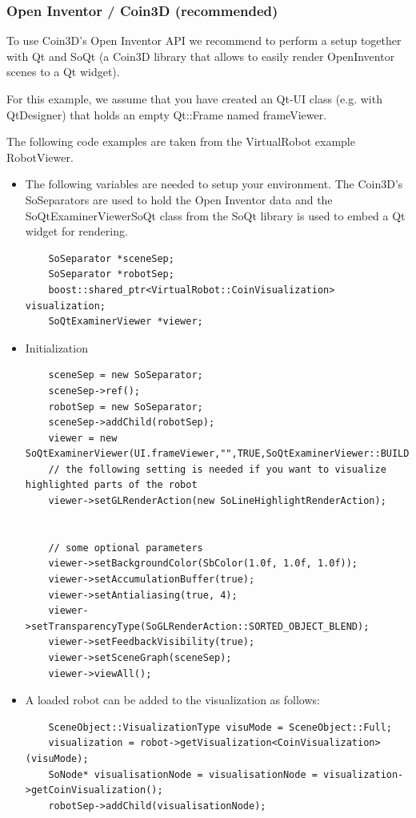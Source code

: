 \subsubsection{Open Inventor / Coin3D (recommended)}
To use Coin3D's Open Inventor API we recommend to perform a setup together with Qt and SoQt (a Coin3D library that allows to easily render OpenInventor scenes to a Qt widget).\par
For this example, we assume that you have created an Qt-UI class (e.g. with QtDesigner) that holds an empty Qt::Frame named frameViewer.\par
The following code examples are taken from the VirtualRobot example RobotViewer. 
\begin{itemize}
\item The following variables are needed to setup your environment. The Coin3D's SoSeparators are used to hold the Open Inventor data and the SoQtExaminerViewerSoQt class from the SoQt library is used to embed a Qt widget for rendering.
\begin{lstlisting}
	SoSeparator *sceneSep;
    SoSeparator *robotSep;
    boost::shared_ptr<VirtualRobot::CoinVisualization> visualization;
    SoQtExaminerViewer *viewer;
\end{lstlisting}
\item Initialization 
\begin{lstlisting}
    sceneSep = new SoSeparator;
    sceneSep->ref();
    robotSep = new SoSeparator;
    sceneSep->addChild(robotSep);
    viewer = new SoQtExaminerViewer(UI.frameViewer,"",TRUE,SoQtExaminerViewer::BUILD_POPUP);
    // the following setting is needed if you want to visualize highlighted parts of the robot
    viewer->setGLRenderAction(new SoLineHighlightRenderAction);


    // some optional parameters
    viewer->setBackgroundColor(SbColor(1.0f, 1.0f, 1.0f));
    viewer->setAccumulationBuffer(true);
    viewer->setAntialiasing(true, 4);
    viewer->setTransparencyType(SoGLRenderAction::SORTED_OBJECT_BLEND);
    viewer->setFeedbackVisibility(true);
    viewer->setSceneGraph(sceneSep);
    viewer->viewAll();
\end{lstlisting}
\item A loaded robot can be added to the visualization as follows:
 \begin{lstlisting}
    SceneObject::VisualizationType visuMode = SceneObject::Full;
    visualization = robot->getVisualization<CoinVisualization>(visuMode);
    SoNode* visualisationNode = visualisationNode = visualization->getCoinVisualization();
    robotSep->addChild(visualisationNode);
\end{lstlisting}
\end{itemize}

